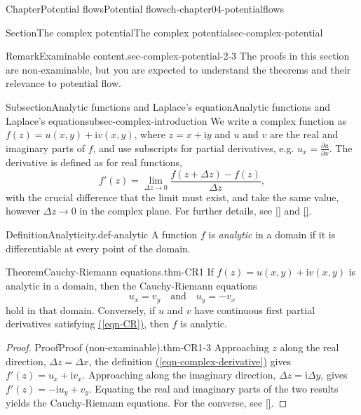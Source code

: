 \documentclass[oneside,10pt,]{book}
\newcommand{\xreffont}{\relax}
\numberwithin{equation}{section}
\newcommand{\im}{\mathrm{i}}
\newcommand{\pd}[2]{\frac{\partial#1}{\partial#2}}
\begin{document}
\begin{chapterptx}{Chapter}{Potential flows}{}{Potential flows}{}{}{ch-chapter04-potentialflows}
\begin{sectionptx}{Section}{The complex potential}{}{The complex potential}{}{}{sec-complex-potential}
\begin{introduction}{}
\begin{remark}{Remark}{Examinable content.}{sec-complex-potential-2-3}
The proofs in this section are non-examinable, but you are expected to understand the theorems and their relevance to potential flow.%
\end{remark}
\end{introduction}%
%
%
\typeout{************************************************}
\typeout{************************************************}
%
\begin{subsectionptx}{Subsection}{Analytic functions and Laplace's equation}{}{Analytic functions and Laplace's equation}{}{}{subsec-complex-introduction}
We write a complex function as \(f(z) = u(x, y) + \im v(x, y)\), where \(z = x + \im y\) and \(u\) and \(v\) are the real and imaginary parts of \(f\), and use subscripts for partial derivatives, e.g. \(u_x = \pd{u}{x}\). The derivative is defined as for real functions,%
\begin{equation}
f'(z) = \lim_{\Delta z \to 0} \frac{f(z + \Delta z) - f(z)}{\Delta z},\label{eqn-complex-derivative}
\end{equation}
with the crucial difference that the limit must exist, and take the same value, however \(\Delta z \to 0\) in the complex plane. For further details, see \hyperlink{ref-kreyszig}{[{\xreffont 2}]} and \hyperlink{ref-fornberg}{[{\xreffont 6}]}.%
\begin{definition}{Definition}{Analyticity.}{}{def-analytic}%
%
A function \(f\) is \emph{analytic} in a domain if it is differentiable at every point of the domain.%
\end{definition}
\begin{theorem}{Theorem}{Cauchy-Riemann equations.}{}{thm-CR1}%
If \(f(z) = u(x, y) + \im v(x, y)\) is analytic in a domain, then the Cauchy-Riemann equations%
\begin{equation}
u_x = v_y \quad \text{and} \quad u_y = -v_x\label{eqn-CR}
\end{equation}
hold in that domain. Conversely, if \(u\) and \(v\) have continuous first partial derivatives satisfying \hyperref[eqn-CR]{({\xreffont\ref{eqn-CR}})}, then \(f\) is analytic.%
\end{theorem}
\begin{proof}{Proof}{Proof (non-examinable).}{thm-CR1-3}
Approaching \(z\) along the real direction, \(\Delta z = \Delta x\), the definition \hyperref[eqn-complex-derivative]{({\xreffont\ref{eqn-complex-derivative}})} gives \(f'(z) = u_x + \im v_x\). Approaching along the imaginary direction, \(\Delta z = \im \Delta y\), gives \(f'(z) = -\im u_y + v_y\). Equating the real and imaginary parts of the two results yields the Cauchy-Riemann equations. For the converse, see \hyperlink{ref-kreyszig}{[{\xreffont 2}]}.%

\end{proof}
\end{subsectionptx}
\end{sectionptx}
\end{chapterptx}
\end{document}
